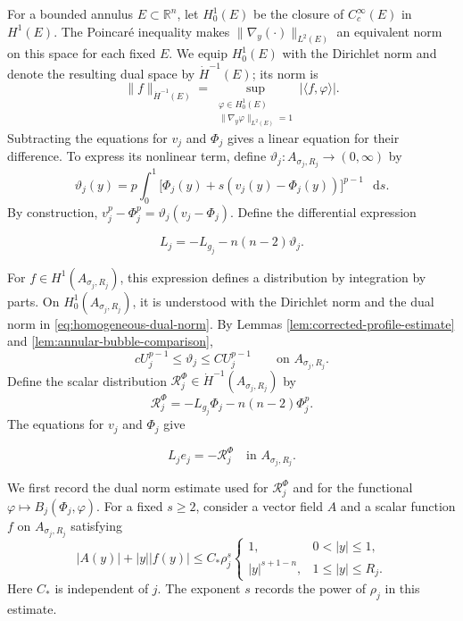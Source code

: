 \documentclass[11pt]{article}
\numberwithin{equation}{section}
\theoremstyle{remark}
\newcommand{\R}{\mathbb R}
\newcommand{\norm}[1]{\lVert #1\rVert}
\newcommand{\dd}{\mathop{}\!\mathrm{d}}
\begin{document}
For a bounded annulus \(E\subset\R^n\), let \(H_0^1(E)\) be the closure
of \(C_c^\infty(E)\) in \(H^1(E)\). The Poincar\'e inequality makes
\(\|\nabla_y(\cdot)\|_{L^2(E)}\) an equivalent norm on this space for
each fixed \(E\). We equip \(H_0^1(E)\) with the Dirichlet norm and
denote the resulting dual space by \(\dot H^{-1}(E)\); its norm is
\begin{equation}\label{eq:homogeneous-dual-norm}
 \norm{f}_{\dot H^{-1}(E)}
 =\sup_{\substack{\varphi\in H_0^1(E)\\
 \norm{\nabla_y\varphi}_{L^2(E)}=1}}
 |\langle f,\varphi\rangle|.
\end{equation}
Subtracting the equations for \(v_j\) and \(\Phi_j\) gives a linear equation
for their difference. To express its nonlinear term, define
\(\vartheta_j:A_{\sigma_j,R_j}\to(0,\infty)\) by
\[
 \vartheta_j(y)=p\int_0^1
 \bigl[\Phi_j(y)
 +s(v_j(y)-\Phi_j(y))\bigr]^{p-1}\,\dd s.
\]
By construction,
\(v_j^p-\Phi_j^p=\vartheta_j(v_j-\Phi_j)\).
Define the differential expression
 
\[
  L_j=-L_{g_j}-n(n-2)\vartheta_j.
\]

For \(f\in H^1(A_{\sigma_j,R_j})\), this expression defines a distribution
by integration by parts. On \(H_0^1(A_{\sigma_j,R_j})\), it is understood
with the Dirichlet norm and the dual norm in
\eqref{eq:homogeneous-dual-norm}.
By Lemmas  \ref{lem:corrected-profile-estimate} and
\ref{lem:annular-bubble-comparison},
\begin{equation}\label{eq:secant-coefficient-bounds}
 cU_j^{p-1}\le\vartheta_j
 \le CU_j^{p-1}\qquad\text{on }A_{\sigma_j,R_j}.
\end{equation}
Define the scalar distribution
\(\mathcal R_j^\Phi\in\dot H^{-1}(A_{\sigma_j,R_j})\) by
\begin{equation}\label{eq:reference-equation-error}
 \mathcal R_j^\Phi=-L_{g_j}\Phi_j
 -n(n-2)\Phi_j^p.
\end{equation}
The equations for \(v_j\) and \(\Phi_j\) give
 
\[
  L_je_j=-\mathcal R_j^\Phi
 \quad\text{in }A_{\sigma_j,R_j}.
\]

\par
We first record the dual norm estimate used for \(\mathcal R_j^\Phi\)
and for the functional
 \(\varphi\mapsto B_j(\Phi_j,\varphi)\).
For a fixed \(s\ge2\), consider a vector field \(A\) and a scalar function
\(f\) on \(A_{\sigma_j,R_j}\) satisfying
\begin{equation}\label{eq:source-field-bounds}
 |A(y)|+|y||f(y)|
 \le C_*\rho_j^s
 \begin{cases}
  1,&0<|y|\le1,\\
  |y|^{s+1-n},&1\le|y|\le R_j.
 \end{cases}
\end{equation}
Here \(C_*\) is independent of \(j\). The exponent \(s\) records the power
of \(\rho_j\) in this estimate.
\end{document}
